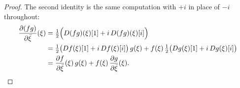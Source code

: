 \begin{proof}
The second identity is the same computation with $+i$ in place of $-i$
throughout:
\begin{align*}
  \frac{\partial(fg)}{\partial\bar\xi}(\xi)
  &=\tfrac12\Bigl(D(fg)(\xi)[1]+i\,D(fg)(\xi)[i]\Bigr)\\
  &=\tfrac12\bigl(Df(\xi)[1]+i\,Df(\xi)[i]\bigr)\,g(\xi)
    +f(\xi)\,\tfrac12\bigl(Dg(\xi)[1]+i\,Dg(\xi)[i]\bigr)\\
  &=\frac{\partial f}{\partial\bar\xi}(\xi)\,g(\xi)+f(\xi)\,\frac{\partial g}{\partial\bar\xi}(\xi).
\end{align*}
\end{proof}
